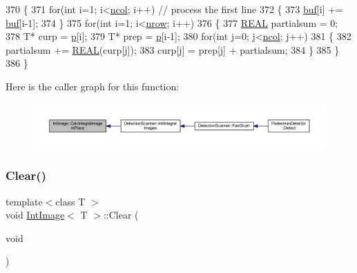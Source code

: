 \begin{DoxyCode}
370 \{
371     \textcolor{keywordflow}{for}(\textcolor{keywordtype}{int} i=1; i<\mbox{\hyperlink{class_array2d_c_a27e0f8f40f644831cd7c750db59dc28a}{ncol}}; i++)   \textcolor{comment}{// process the first line}
372     \{
373         \mbox{\hyperlink{class_array2d_c_a25d8fa5049d4c7ded126e0acdd18f37a}{buf}}[i] += \mbox{\hyperlink{class_array2d_c_a25d8fa5049d4c7ded126e0acdd18f37a}{buf}}[i-1];
374     \}
375     \textcolor{keywordflow}{for}(\textcolor{keywordtype}{int} i=1; i<\mbox{\hyperlink{class_array2d_c_a12f690f7195f7674a86a7e1eedbc473c}{nrow}}; i++)
376     \{
377         \mbox{\hyperlink{c4-pedestrian-detector_8h_a5821460e95a0800cf9f24c38915cbbde}{REAL}} partialsum = 0;
378         T* curp = \mbox{\hyperlink{class_array2d_c_a727eae5d663d463635cc150e6f771f0d}{p}}[i];
379         T* prep = \mbox{\hyperlink{class_array2d_c_a727eae5d663d463635cc150e6f771f0d}{p}}[i-1];
380         \textcolor{keywordflow}{for}(\textcolor{keywordtype}{int} j=0; j<\mbox{\hyperlink{class_array2d_c_a27e0f8f40f644831cd7c750db59dc28a}{ncol}}; j++)
381         \{
382             partialsum += \mbox{\hyperlink{c4-pedestrian-detector_8h_a5821460e95a0800cf9f24c38915cbbde}{REAL}}(curp[j]);
383             curp[j] = prep[j] + partialsum;
384         \}
385     \}
386 \}
\end{DoxyCode}
Here is the caller graph for this function\+:\nopagebreak
\begin{figure}[H]
\begin{center}
\leavevmode
\includegraphics[width=350pt]{class_int_image_a4b955bc5382ee4745a5ab92fc48b4a6a_icgraph}
\end{center}
\end{figure}
\mbox{\label{class_int_image_a183a2bb5b576ab7a03010c0fff8f47cb}} 
\subsubsection{\texorpdfstring{Clear()}{Clear()}}
{\footnotesize\ttfamily template$<$class T $>$ \\
void \mbox{\hyperlink{class_int_image}{Int\+Image}}$<$ T $>$\+::Clear (\begin{DoxyParamCaption}\item[{void}]{ }\end{DoxyParamCaption})\hspace{0.3cm}{\ttfamily [virtual]}}



